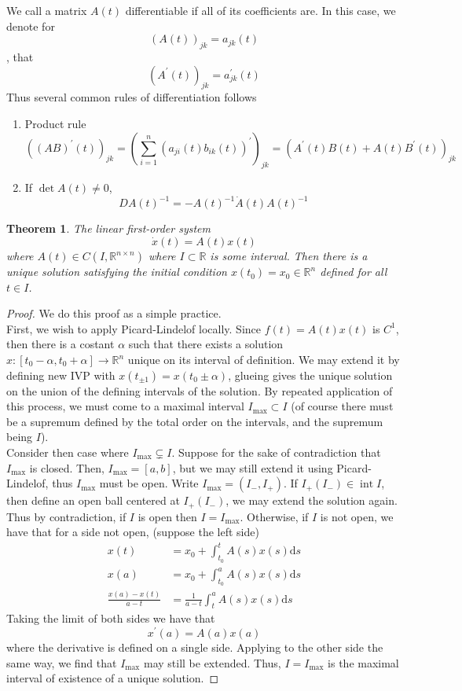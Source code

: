 \documentclass[a4paper, 12pt]{book}
\newtheorem{theorem}{Theorem}[chapter]
\begin{document}
We call a matrix \( A(t) \) differentiable if all of its coefficients are. In this case, we denote for \[
	(A(t))_{jk} =a_{jk} (t)
\], that
\[
	(A^\prime(t))_{jk} = a^\prime_{jk} (t)
\]
Thus several common rules of differentiation follows
\begin{enumerate}
	\item Product rule \[
		      ((AB)^\prime(t))_{jk} =(\sum_{i=1}^{n} (a_{ji}(t)b_{ik} (t))^\prime)_{jk}=(A^\prime(t)B(t)+A(t)B^\prime(t))_{jk}
	      \]
	\item If \( \det A(t) \neq 0 \), \[
		      DA(t)^{-1} =-A(t)^{-1} \dot{A}(t)A(t)^{-1}
	      \]
\end{enumerate}
\begin{theorem}
	The linear first-order system \[
		\dot{x}(t)=A(t)x(t)
	\]
	where \( A(t)\in C(I, \mathbb{R}^{n\times n} ) \) where \( I\subset \mathbb{R} \) is some interval. Then there is a unique solution satisfying the initial condition \( x(t_0)=x_0\in \mathbb{R}^{n}\) defined for all \( t\in I \).
	\label{thm:Linear First Order System}
\end{theorem}
\begin{proof}
	We do this proof as a simple practice.\\

	First, we wish to apply Picard-Lindelof locally. Since \( f(t)=A(t)x(t) \) is \( C^1 \), then there is a costant \( \alpha \) such that there exists a solution \( x:[t_0-\alpha, t_0+\alpha ]\to \mathbb{R}^n \) unique on its interval of definition. We may extend it by defining new IVP with \( x(t_{\pm 1} )=x(t_0\pm \alpha ) \), glueing gives the unique solution on the union of the defining intervals of the solution. By repeated application of this process, we must come to a maximal interval \( I_{\max} \subset I\) (of course there must be a supremum defined by the total order on the intervals, and the supremum being \( I \)). \\

	Consider then case where \( I_{\max} \subsetneq I\). Suppose for the sake of contradiction that \( I_{\max} \) is closed. Then, \( I_{\max}=[a,b] \), but we may still extend it using Picard-Lindelof, thus \( I_{\max} \) must be open. Write \( I_{\max} = (I_-,I_+) \). If \( I_+ (I_-)\in \operatorname{int} I   \), then define an open ball centered at \( I_+ (I_-)  \), we may extend the solution again. Thus by contradiction, if \( I \)  is open then \( I=I_{\max} \). Otherwise, if \( I \) is not open, we have that for a side not open, (suppose the left side)
	\begin{align*}
		x(t)                      & =x_0+\int_{t_0}^{t} A(s)x(s)\mathrm{d}s             \\
		x(a)                      & =x_0+\int_{t_0}^{a} A(s)x(s)\mathrm{d}s             \\
		\frac{ x(a)-x(t) }{ a-t } & =\frac{ 1 }{ a-t } \int_{t}^{a} A(s)x(s)\mathrm{d}s
	\end{align*}
	Taking the limit of both sides we have that \[
		x^\prime(a)=A(a)x(a)
	\]
	where the derivative is defined on a single side.
	Applying to the other side the same way, we find that \( I_{\max} \) may still be extended. Thus, \( I=I_{\max} \) is the maximal interval of existence of a unique solution.
\end{proof}
\end{document}
